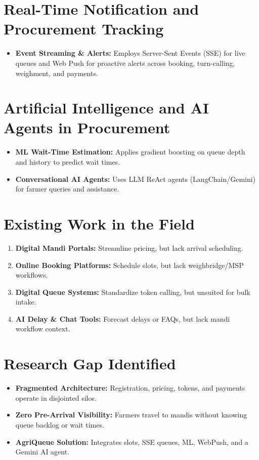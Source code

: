 \section{Real-Time Notification and Procurement Tracking}
\begin{itemize}[noitemsep, topsep=1pt, parsep=0pt, partopsep=0pt]
  \item \textbf{Event Streaming \& Alerts:} Employs Server-Sent Events (SSE) for live queues and Web Push for proactive alerts across booking, turn-calling, weighment, and payments.
\end{itemize}

\section{Artificial Intelligence and AI Agents in Procurement}
\begin{itemize}[noitemsep, topsep=1pt, parsep=0pt, partopsep=0pt]
  \item \textbf{ML Wait-Time Estimation:} Applies gradient boosting on queue depth and history to predict wait times.
  \item \textbf{Conversational AI Agents:} Uses LLM ReAct agents (LangChain/Gemini) for farmer queries and assistance.
\end{itemize}

\section{Existing Work in the Field}
\begin{enumerate}[noitemsep, topsep=1pt, parsep=0pt, partopsep=0pt]
  \item \textbf{Digital Mandi Portals:} Streamline pricing, but lack arrival scheduling.
  \item \textbf{Online Booking Platforms:} Schedule slots, but lack weighbridge/MSP workflows.
  \item \textbf{Digital Queue Systems:} Standardize token calling, but unsuited for bulk intake.
  \item \textbf{AI Delay \& Chat Tools:} Forecast delays or FAQs, but lack mandi workflow context.
\end{enumerate}

\section{Research Gap Identified}
\begin{itemize}[noitemsep, topsep=1pt, parsep=0pt, partopsep=0pt]
  \item \textbf{Fragmented Architecture:} Registration, pricing, tokens, and payments operate in disjointed silos.
  \item \textbf{Zero Pre-Arrival Visibility:} Farmers travel to mandis without knowing queue backlog or wait times.
  \item \textbf{AgriQueue Solution:} Integrates slots, SSE queues, ML, WebPush, and a Gemini AI agent.
\end{itemize}


